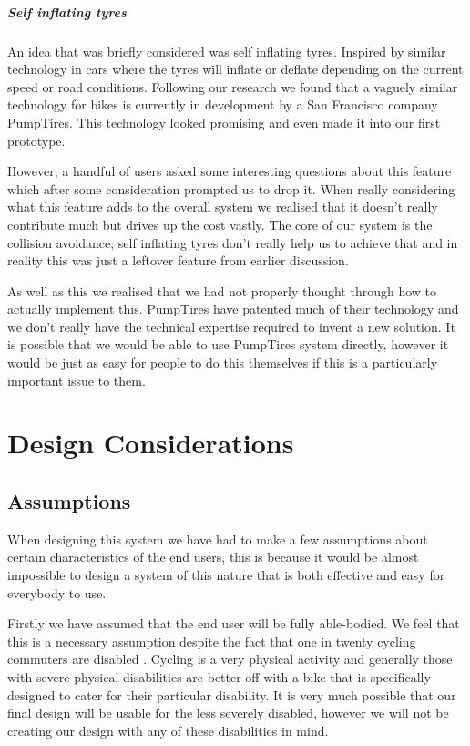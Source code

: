 \documentclass[a4paper]{report}
\begin{document}
\paragraph{Self inflating tyres} An idea that was briefly considered was self inflating tyres. Inspired by similar technology in cars where the tyres will inflate or deflate depending on the current speed or road conditions. Following our research we found that a vaguely similar technology for bikes is currently in development by a San Francisco company PumpTires\cite{pumptyres}. This technology looked promising and even made it into our first prototype.

However, a handful of users asked some interesting questions about this feature which after some consideration prompted us to drop it. When really considering what this feature adds to the overall system we realised that it doesn't really contribute much but drives up the cost vastly. The core of our system is the collision avoidance; self inflating tyres don't really help us to achieve that and in reality this was just a leftover feature from earlier discussion.

As well as this we realised that we had not properly thought through how to actually implement this. PumpTires have patented much of their technology and we don't really have the technical expertise required to invent a new solution. It is possible that we would be able to use PumpTires system directly, however it would be just as easy for people to do this themselves if this is a particularly important issue to them.

\chapter{Design Considerations}
\section{Assumptions}
When designing this system we have had to make a few assumptions about certain characteristics of the end users, this is because it would be almost impossible to design a system of this nature that is both effective and easy for everybody to use. 

Firstly we have assumed that the end user will be fully able-bodied. We feel that this is a necessary assumption despite the fact that one in twenty cycling commuters are disabled \citep{census-dis}. Cycling is a very physical activity and generally those with severe physical disabilities are better off with a bike that is specifically designed to cater for their particular disability. It is very much possible that our final design will be usable for the less severely disabled, however we will not be creating our design with any of these disabilities in mind. 
\end{document}
